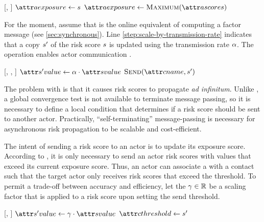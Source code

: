 \begin{function}[H]{\nUpdateExposureScore}[\vActor, \vScore]
  \If{$\aActorExposureValue < \aScoreValue$}
    \State $\aActorExposure \assign \vScore$
    \State $\aActorExposure \assign \cMaximum[\aActorScores]$
  \EndIf
\end{function}

For the moment, assume that \cApplyRiskScore is the online equivalent of computing a factor message (see \cref{sec:synchronous}). Line \ref{step:scale-by-transmission-rate} indicates that a copy $s'$ of the risk score $s$ is updated using the transmission rate $\alpha$. The \cSend operation enables actor communication \citep{Agha1985}.

\begin{function}[H]{\nApplyRiskScore}[\vActor, \vContact, \vScore]
  \If{$\aContactTime + \pTimeBuffer > \aScoreTime$}
    \State $\aNewScoreValue \assign \pTransmissionRate \cdot \aScoreValue$ \label{step:scale-by-transmission-rate}
    \State $\cSend[\aContactName, \vNewScore]$
  \EndIf
\end{function}

The problem with \cApplyRiskScore is that it causes risk scores to propagate \textit{ad infinitum}. Unlike \cRiskPropagation, a global convergence test is not available to terminate message passing, so it is necessary to define a local condition that determines if a risk score should be sent to another actor. Practically, ``self-terminating'' message-passing is necessary for asynchronous risk propagation to be scalable and cost-efficient.

The intent of sending a risk score to an actor is to update its exposure score. According to \cHandleRiskScore, it is only necessary to send an actor risk scores with values that exceed its current exposure score. Thus, an actor can associate a  with a contact such that the target actor only receives risk scores that exceed the threshold. To permit a trade-off between accuracy and efficiency, let the  $\gamma \in \mathbb{R}$ be a scaling factor that is applied to a risk score upon setting the send threshold.

\begin{function}{\nSetSendThreshold}[\vContact, \vScore]
  \State $\aNewScoreValue \assign \pSendCoefficient \cdot \aScoreValue$
  \State $\aContactThreshold \assign \vNewScore$
\end{function}

